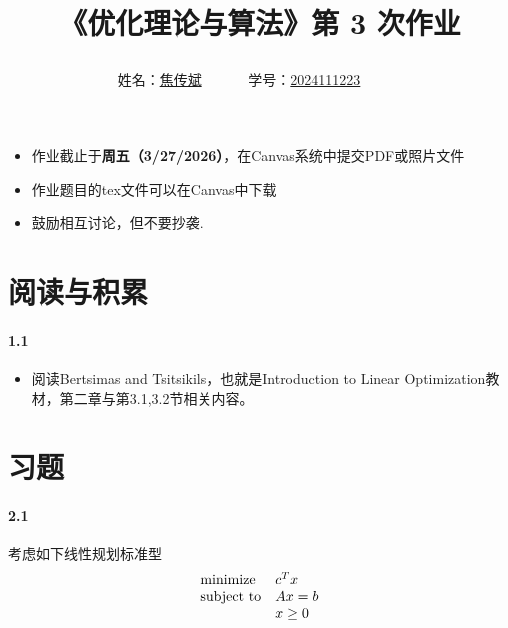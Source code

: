 \documentclass[12pt,a4paper]{article}
\begin{document}
\title{
{《优化理论与算法》第 3 次作业
}

}
\date{}

\author{
姓名：\underline{焦传斌}~~~~~~
学号：\underline{2024111223}~~~~~~}

\maketitle

\begin{itemize}
	\item 作业截止于{\bf 周五（3/27/2026）}，在Canvas系统中提交PDF或照片文件
	\item 作业题目的tex文件可以在Canvas中下载
	\item 鼓励相互讨论，但不要抄袭.
\end{itemize}

\section{阅读与积累}
\paragraph{1.1}
\begin{itemize}
	\item 阅读Bertsimas and Tsitsikils，也就是Introduction to Linear Optimization教材，第二章与第3.1,3.2节相关内容。
\end{itemize}

\section{习题}


\paragraph{2.1}
考虑如下线性规划标准型
\begin{equation*}
\begin{array}{lllll@{}ll}
\text{minimize}  & c^Tx\\
\text{subject to}&Ax=b \\
&x \geq 0
\end{array}
\end{equation*}
\end{document}
